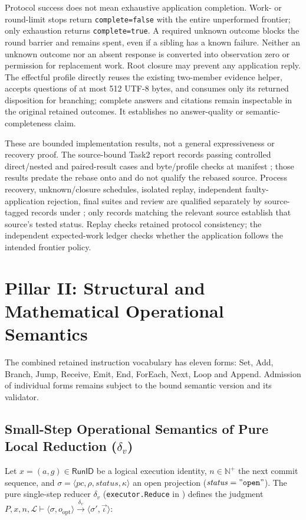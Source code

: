\documentclass[11pt,a4paper]{article}
\theoremstyle{definition}
\theoremstyle{remark}
\newcommand{\RunID}{\mathsf{RunID}}
\begin{document}
Protocol success does not mean exhaustive application completion. Work- or round-limit stops return \texttt{complete=false} with the entire unperformed frontier; only exhaustion returns \texttt{complete=true}. A required unknown outcome blocks the round barrier and remains spent, even if a sibling has a known failure. Neither an unknown outcome nor an absent response is converted into observation zero or permission for replacement work. Root closure may prevent any application reply. The effectful profile directly reuses the existing two-member evidence helper, accepts questions of at most 512 UTF-8 bytes, and consumes only its returned disposition for branching; complete answers and citations remain inspectable in the original retained outcomes. It establishes no answer-quality or semantic-completeness claim.

These are bounded implementation results, not a general expressiveness or recovery proof. The source-bound Task2 report records passing controlled direct/nested and paired-result cases and byte/profile checks at manifest ; those results predate the rebase onto  and do not qualify the rebased source. Process recovery, unknown/closure schedules, isolated replay, independent faulty-application rejection, final suites and review are qualified separately by source-tagged records under ; only records matching the relevant source establish that source's tested status. Replay checks retained protocol consistency; the independent expected-work ledger checks whether the application follows the intended frontier policy.

\section{Pillar II: Structural and Mathematical Operational Semantics}

The combined retained instruction vocabulary has eleven forms: Set, Add, Branch, Jump, Receive, Emit, End, ForEach, Next, Loop and Append. Admission of individual forms remains subject to the bound semantic version and its validator.

\subsection{Small-Step Operational Semantics of Pure Local Reduction (\texorpdfstring{$\delta_v$}{delta\_v})}
Let $x = (a, g) \in \RunID$ be a logical execution identity, $n \in \mathbb{N}^+$ the next commit sequence, and $\sigma = \langle \mathit{pc}, \rho, \mathit{status}, \kappa \rangle$ an open projection ($\mathit{status} = \mathtt{"open"}$). The pure single-step reducer $\delta_v$ (\texttt{executor.Reduce} in ) defines the judgment $P, x, n, \mathcal{L} \vdash \langle \sigma, o_{\text{opt}} \rangle \xrightarrow{\delta_v} \langle \sigma', \vec{\iota} \rangle$:
\end{document}

